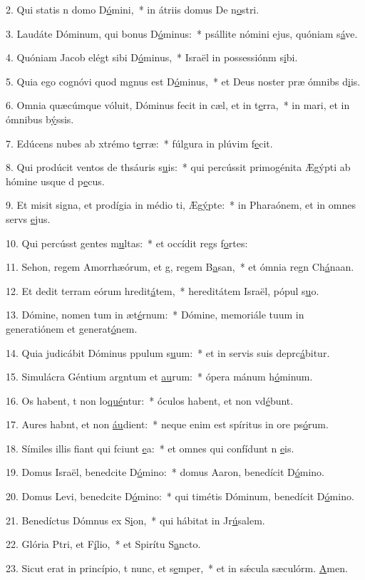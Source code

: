 2. Qui statis n domo D\uline{ó}mini,~* in átriis domus De n\uline{o}stri.\par 
3. Laudáte Dóminum, qui bonus D\uline{ó}minus:~* psállite nómini ejus, quóniam s\uline{á}ve.\par 
4. Quóniam Jacob elégt sibi D\uline{ó}minus,~* Israël in possessiónm s\uline{i}bi.\par 
5. Quia ego cognóvi quod mgnus est D\uline{ó}minus,~* et Deus noster præ ómnibs d\uline{i}is.\par 
6. Omnia quæcúmque vóluit, Dóminus fecit in cæl, et in t\uline{e}rra,~* in mari, et in ómnibus b\uline{ý}ssis.\par 
7. Edúcens nubes ab xtrémo t\uline{e}rræ:~* fúlgura in plúvim f\uline{e}cit.\par 
8. Qui prodúcit ventos de thsáuris s\uline{u}is:~* qui percússit primogénita Ægýpti ab hómine usque d p\uline{e}cus.\par 
9. Et misit signa, et prodígia in médio ti, Æg\uline{ý}pte:~* in Pharaónem, et in omnes servs \uline{e}jus.\par 
10. Qui percússt gentes m\uline{u}ltas:~* et occídit regs f\uline{o}rtes:\par 
11. Sehon, regem Amorrhæórum, et g, regem B\uline{a}san,~* et ómnia regn Ch\uline{á}naan.\par 
12. Et dedit terram eórum hredit\uline{á}tem,~* hereditátem Israël, pópul s\uline{u}o.\par 
13. Dómine, nomen tum in æt\uline{é}rnum:~* Dómine, memoriále tuum in generatiónem et generat\uline{ó}nem.\par 
14. Quia judicábit Dóminus ppulum s\uline{u}um:~* et in servis suis deprc\uline{á}bitur.\par 
15. Simulácra Géntium argntum et \uline{au}rum:~* ópera mánum h\uline{ó}minum.\par 
16. Os habent, t non lo\uline{qué}ntur:~* óculos habent, et non vd\uline{é}bunt.\par 
17. Aures habnt, et non \uline{áu}dient:~* neque enim est spíritus in ore ps\uline{ó}rum.\par 
18. Símiles illis fiant qui fciunt \uline{e}a:~* et omnes qui confídunt n \uline{e}is.\par 
19. Domus Israël, benedcite D\uline{ó}mino:~* domus Aaron, benedícit D\uline{ó}mino.\par 
20. Domus Levi, benedcite D\uline{ó}mino:~* qui timétis Dóminum, benedícit D\uline{ó}mino.\par 
21. Benedíctus Dómnus ex S\uline{i}on,~* qui hábitat in Jr\uline{ú}salem.\par 
22. Glória Ptri, et F\uline{í}lio,~* et Spirítu S\uline{a}ncto.\par 
23. Sicut erat in princípio, t nunc, et s\uline{e}mper,~* et in sǽcula sæculórm. \uline{A}men.\par 
